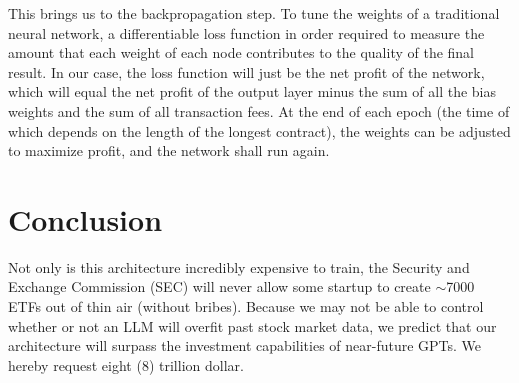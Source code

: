 \documentclass[12pt]{article}
\begin{document}
This brings us to the backpropagation step. To tune the weights of a traditional neural network, a differentiable loss function in order required to measure the amount that each weight of each node contributes to the quality of the final result. In our case, the loss function will just be the net profit of the network, which will equal the net profit of the output layer minus the sum of all the bias weights and the sum of all transaction fees. At the end of each epoch (the time of which depends on the length of the longest contract), the weights can be adjusted to maximize profit, and the network shall run again.
\section{Conclusion}
Not only is this architecture incredibly expensive to train, the Security and Exchange Commission (SEC) will never allow some startup to create $\sim$7000 ETFs out of thin air (without bribes). Because we may not be able to control whether or not an LLM will overfit past stock market data, we predict that our architecture will surpass the investment capabilities of near-future GPTs. We hereby request eight (8) trillion dollar.\newline\newline\newline\newline\newline\newline\newline\newline\newline\newline\newline\newline\newline\newline\newline\newline

\doclicenseThis
\end{document}
